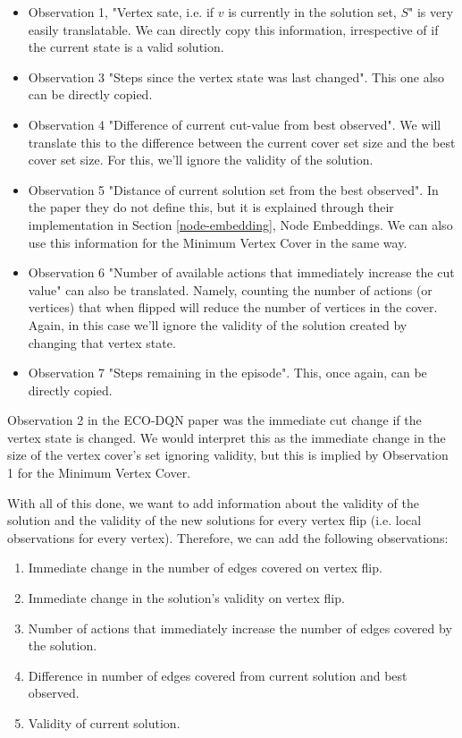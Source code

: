 \documentclass{article}
\begin{document}
\begin{itemize}
    \item Observation 1, "Vertex sate, i.e. if $v$ is currently in the solution set, $S$" is very easily translatable. We can directly copy this information, irrespective of if the current state is a valid solution.
    \item Observation 3 "Steps since the vertex state was last changed". This one also can be directly copied.
    \item Observation 4 "Difference of current cut-value from best observed". We will translate this to the difference between the current cover set size and the best cover set size. For this, we'll ignore the validity of the solution.
    \item Observation 5 "Distance of current solution set from the best observed". In the paper they do not define this, but it is explained through their implementation in Section \ref{node-embedding}, Node Embeddings. We can also use this information for the Minimum Vertex Cover in the same way.
    \item Observation 6 "Number of available actions that immediately increase the cut value" can also be translated. Namely, counting the number of actions (or vertices) that when flipped will reduce the number of vertices in the cover. Again, in this case we'll ignore the validity of the solution created by changing that vertex state.
    \item Observation 7 "Steps remaining in the episode". This, once again, can be directly copied.
\end{itemize}

Observation 2 in the ECO-DQN paper was the immediate cut change if the vertex state is changed. We would interpret this as the immediate change in the size of the vertex cover's set ignoring validity, but this is implied by Observation 1 for the Minimum Vertex Cover. 

With all of this done, we want to add information about the validity of the solution and the validity of the new solutions for every vertex flip (i.e. local observations for every vertex). Therefore, we can add the following observations:

\begin{enumerate}
    \item Immediate change in the number of edges covered on vertex flip.
    \item Immediate change in the solution's validity on vertex flip.
    \item Number of actions that immediately increase the number of edges covered by the solution.
    \item Difference in number of edges covered from current solution and best observed.
    \item Validity of current solution. 
\end{enumerate}
\end{document}
